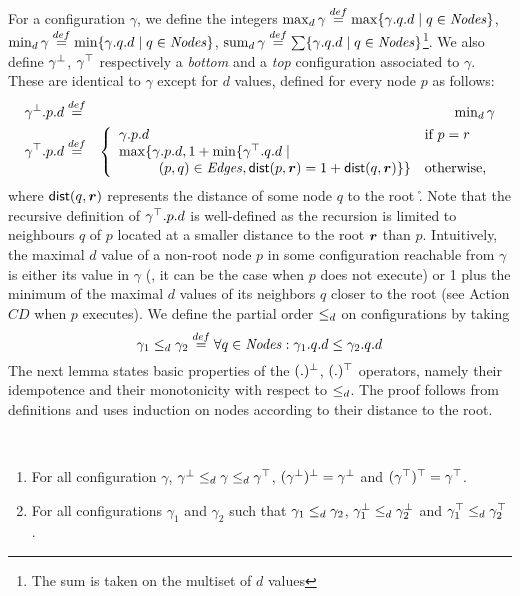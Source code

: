 For a configuration $\gamma$, we define the integers $\max\nolimits_d\gamma
\stackrel{def}= \max \{\gamma.q.d \mid q \in \mathit{Nodes}\}$, $\min\nolimits_d\gamma \stackrel{def}=
\min \{\gamma.q.d \mid q \in \mathit{Nodes}\}$, $\mathop{\mathrm{sum}_d}\gamma \stackrel{def}= \sum
\{\gamma.q.d \mid q \in \mathit{Nodes}\}$\footnote{The sum is taken on the
multiset of $d$ values}.  We also define $\gamma^{\bot}$,
$\gamma^{\top}$ respectively a \emph{bottom} and a \emph{top}
configuration associated to $\gamma$.  These are identical to $\gamma$
except for $d$ values, defined for every node $p$ as follows:
\begin{eqnarray*}
  \gamma^{\bot}.p.d & \stackrel{def}= & \min\nolimits_d\gamma \\
  \gamma^{\top}.p.d & \stackrel{def}= & \left\{ \begin{array}{ll}
    \gamma.p.d & \mbox{if } p = r \\
    \max \{ \gamma.p.d, 1 + \min \{ \gamma^{\top}.q.d \mid \\
    \hspace{1cm} (p,q)\in \mathit{Edges}, \mathsf{dist}(p,\boldsymbol{r}) = 1 + \mathsf{dist}(q,\boldsymbol{r}) \}
    \} &
    \mbox{otherwise,}
  \end{array} \right.
\end{eqnarray*}
where $\mathsf{dist}(q,\boldsymbol{r})$ represents the distance of some node $q$ to the
root \r.  Note that the recursive definition of $\gamma^{\top}.p.d$ is
well-defined as the recursion is limited to neighbours $q$ of $p$
located at a smaller distance to the root $\boldsymbol{r}$ than $p$.  Intuitively,
the maximal $d$ value of a non-root node $p$ in some configuration
reachable from $\gamma$ is either its value in $\gamma$ (\ie, it can
be the case when $p$ does not execute) or 1 plus the minimum of the
maximal $d$ values of its neighbors $q$ closer to the root
(see Action $CD$ when $p$ executes).
We define the partial order $\le_d$ on configurations by taking
%
$$ \gamma_1 \le_d \gamma_2 \stackrel{def}= \forall q \in \mathit{Nodes}: \gamma_1.q.d
\le \gamma_2.q.d $$
%
The next lemma states basic properties of the $(.)^{\bot}$,
$(.)^{\top}$ operators, namely their idempotence and
their monotonicity with respect to $\le_d$.  The proof follows from
definitions and uses induction on nodes according to their
distance to the root.

\begin{lemma} \label{lemma:bounds:basic} ~
  
  \begin{enumerate}[label=(\roman*)]
  \item For all configuration $\gamma$,
  $\gamma^{\bot} \le_d \gamma \le_d \gamma^{\top}$,
  $(\gamma^{\bot})^{\bot} = \gamma^{\bot}$ and $(\gamma^{\top})^{\top}
  = \gamma^{\top}$.

  \item For all configurations $\gamma_1$ and $\gamma_2$ such that
  $\gamma_1 \le_d \gamma_2$, $\gamma_1^{\bot} \le_d \gamma_2^{\bot}$ and
  $\gamma_1^{\top} \le_d \gamma_2^{\top}$.

\end{enumerate}
\end{lemma}

